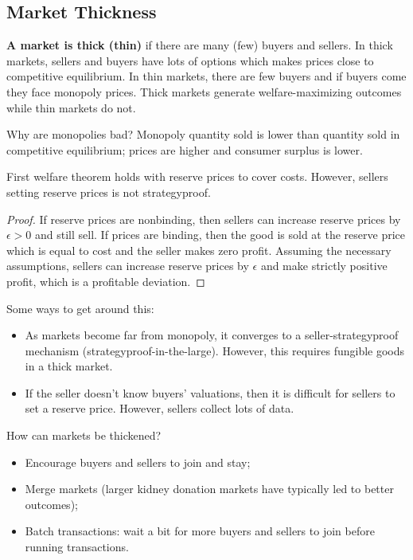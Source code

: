 \documentclass[dvipsnames]{article}
\theoremstyle{definition}
\theoremstyle{remark}
\begin{document}
\subsection{Market Thickness}
\textbf{A market is thick (thin)} if there are many (few) buyers and sellers. In thick markets, sellers and buyers have lots of options which makes prices close to competitive equilibrium. In thin markets, there are few buyers and if buyers come they face monopoly prices. Thick markets generate welfare-maximizing outcomes while thin markets do not. 

Why are monopolies bad? Monopoly quantity sold is lower than quantity sold in competitive equilibrium; prices are higher and consumer surplus is lower. 

First welfare theorem holds with reserve prices to cover costs. However, sellers setting reserve prices is not strategyproof. 

\begin{proof}
	If reserve prices are nonbinding, then sellers can increase reserve prices by $\epsilon > 0$  and still sell. If prices are binding, then the good is sold at the reserve price which is equal to cost and the seller makes zero profit. Assuming the necessary assumptions, sellers can increase reserve prices by $\epsilon$ and make strictly positive profit, which is a profitable deviation. 
\end{proof}

Some ways to get around this:
\begin{itemize}
	\item As markets become far from monopoly, it converges to a seller-strategyproof mechanism (strategyproof-in-the-large). However, this requires fungible goods in a thick market.
	\item If the seller doesn't know buyers' valuations, then it is difficult for sellers to set a reserve price. However, sellers collect lots of data.
\end{itemize}

How can markets be thickened?
\begin{itemize}
	\item Encourage buyers and sellers to join and stay;
	\item Merge markets (larger kidney donation markets have typically led to better outcomes);
	\item Batch transactions: wait a bit for more buyers and sellers to join before running transactions.
\end{itemize}
\end{document}
